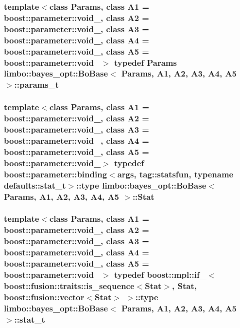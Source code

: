 \subsubsection[{params\+\_\+t}]{\setlength{\rightskip}{0pt plus 5cm}template$<$class Params, class A1 = boost\+::parameter\+::void\+\_\+, class A2 = boost\+::parameter\+::void\+\_\+, class A3 = boost\+::parameter\+::void\+\_\+, class A4 = boost\+::parameter\+::void\+\_\+, class A5 = boost\+::parameter\+::void\+\_\+$>$ typedef Params {\bf limbo\+::bayes\+\_\+opt\+::\+Bo\+Base}$<$ Params, A1, A2, A3, A4, A5 $>$\+::{\bf params\+\_\+t}}\label{classlimbo_1_1bayes__opt_1_1_bo_base_a3fb955ab00c385f5deb56f3d18211d3d}
\hypertarget{classlimbo_1_1bayes__opt_1_1_bo_base_a0da8155a1a5be0999e112655ec3d610e}{}
\subsubsection[{Stat}]{\setlength{\rightskip}{0pt plus 5cm}template$<$class Params, class A1 = boost\+::parameter\+::void\+\_\+, class A2 = boost\+::parameter\+::void\+\_\+, class A3 = boost\+::parameter\+::void\+\_\+, class A4 = boost\+::parameter\+::void\+\_\+, class A5 = boost\+::parameter\+::void\+\_\+$>$ typedef boost\+::parameter\+::binding$<${\bf args}, tag\+::statsfun, typename {\bf defaults\+::stat\+\_\+t}$>$\+::type {\bf limbo\+::bayes\+\_\+opt\+::\+Bo\+Base}$<$ Params, A1, A2, A3, A4, A5 $>$\+::{\bf Stat}}\label{classlimbo_1_1bayes__opt_1_1_bo_base_a0da8155a1a5be0999e112655ec3d610e}
\hypertarget{classlimbo_1_1bayes__opt_1_1_bo_base_a67aac9bd22ae3de346afe7ffe5b564d3}{}
\subsubsection[{stat\+\_\+t}]{\setlength{\rightskip}{0pt plus 5cm}template$<$class Params, class A1 = boost\+::parameter\+::void\+\_\+, class A2 = boost\+::parameter\+::void\+\_\+, class A3 = boost\+::parameter\+::void\+\_\+, class A4 = boost\+::parameter\+::void\+\_\+, class A5 = boost\+::parameter\+::void\+\_\+$>$ typedef boost\+::mpl\+::if\+\_\+$<$boost\+::fusion\+::traits\+::is\+\_\+sequence$<${\bf Stat}$>$, {\bf Stat}, boost\+::fusion\+::vector$<${\bf Stat}$>$ $>$\+::type {\bf limbo\+::bayes\+\_\+opt\+::\+Bo\+Base}$<$ Params, A1, A2, A3, A4, A5 $>$\+::{\bf stat\+\_\+t}}\label{classlimbo_1_1bayes__opt_1_1_bo_base_a67aac9bd22ae3de346afe7ffe5b564d3}
\hypertarget{classlimbo_1_1bayes__opt_1_1_bo_base_ad045a21de8950f3671f6b156f2271e44}{}
